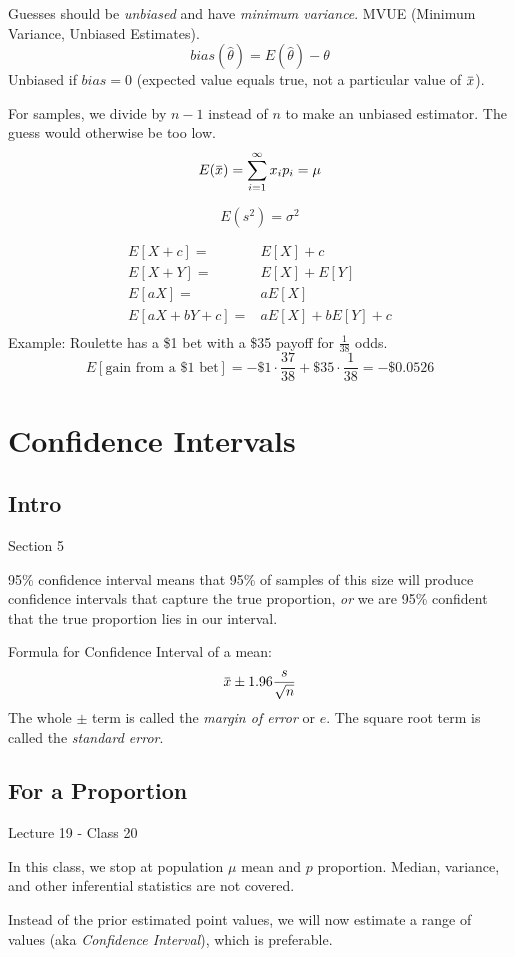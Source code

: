 \documentclass[11pt, oneside]{article}   	%
\newcommand{\overbar}[1]{\mkern 1.5mu\overline{\mkern-1.5mu#1\mkern-1.5mu}\mkern 1.5mu}
\begin{document}
Guesses should be \textit{unbiased} and have \textit{minimum variance}. MVUE (Minimum Variance, Unbiased Estimates).
\[
bias(\hat{\theta}) = E(\hat{\theta}) - \theta
\]
Unbiased if $bias = 0$ (expected value equals true, not a particular value of $\overbar{x}$). 

For samples, we divide by $n-1$ instead of $n$ to make an unbiased estimator. The guess would otherwise be too low.
\[
E(\overbar{x}) = \sum\limits_{i=1}^{\infty} x_i p_i = \mu
\]

\[
E(s^2) = \sigma^2
\]

\begin{align*}
E[X + c] =& E[X] + c\\
E[X + Y] =& E[X] + E[Y]\\
E[aX] =& a E[X]\\
E[aX + bY + c] =& aE[X] + bE[Y] +c\\
\end{align*}
Example: Roulette has a \$1 bet with a \$35 payoff for $\frac{1}{38}$ odds.
\[
E[\text{gain from a \$1 bet}] = -\$1 \cdot \frac{37}{38} + \$35 \cdot \frac{1}{38} = -\$0.0526
\]

\section{Confidence Intervals}
\subsection{Intro}
Section 5

95\% confidence interval means that 95\% of samples of this size will produce confidence intervals that capture the true proportion, \textit{or} we are 95\% confident that the true proportion lies in our interval.

Formula for Confidence Interval of a mean:
\[
\overbar{x} \pm 1.96 \frac{s}{\sqrt{n}}
\]
The whole $\pm$ term is called the \textit{margin of error} or $e$. The square root term is called the \textit{standard error}.

\subsection{For a Proportion}

Lecture 19 - Class 20

In this class, we stop at population $\mu$ mean and $p$ proportion. Median, variance, and other inferential statistics are not covered.

Instead of the prior estimated point values, we will now estimate a range of values (aka \textit{Confidence Interval}), which is preferable.
\end{document}
